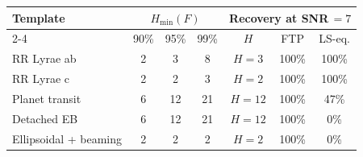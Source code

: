 \begin{tabular}{lcccccc}
\hline
Template & \multicolumn{3}{c}{$H_{\min}(F)$} & \multicolumn{3}{c}{Recovery at SNR\,$=7$} \\
\cline{2-4} \cline{5-7}
& 90\% & 95\% & 99\% & $H$ & FTP & LS-eq. \\
\hline
RR Lyrae ab & 2 & 3 & 8 & $H=3$ & 100\% & 100\% \\
RR Lyrae c & 2 & 2 & 3 & $H=2$ & 100\% & 100\% \\
Planet transit & 6 & 12 & 21 & $H=12$ & 100\% & 47\% \\
Detached EB & 6 & 12 & 21 & $H=12$ & 100\% & 0\% \\
Ellipsoidal + beaming & 2 & 2 & 2 & $H=2$ & 100\% & 0\% \\
\hline
\end{tabular}
